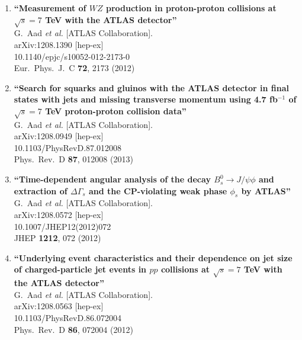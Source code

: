\documentclass{article}
\begin{document}
\begin{enumerate}
\item%
{\bf ``Measurement of $WZ$ production in proton-proton collisions at $\sqrt{s}=7$ TeV with the ATLAS detector''}
  \\{}G.~Aad {\it et al.}  [ATLAS Collaboration].
  \\{}arXiv:1208.1390 [hep-ex]
    \\{}10.1140/epjc/s10052-012-2173-0
\\{}Eur.\ Phys.\ J.\ C {\bf 72}, 2173 (2012) %


\item%
{\bf ``Search for squarks and gluinos with the ATLAS detector in final states with jets and missing transverse momentum using 4.7 fb$^{-1}$ of $\sqrt{s}=7$ TeV proton-proton collision data''}
  \\{}G.~Aad {\it et al.}  [ATLAS Collaboration].
  \\{}arXiv:1208.0949 [hep-ex]
    \\{}10.1103/PhysRevD.87.012008
\\{}Phys.\ Rev.\ D {\bf 87}, 012008 (2013) %


\item%
{\bf ``Time-dependent angular analysis of the decay $B_{s}^{0} \to J/{\psi\phi}$ and extraction of $\Delta\Gamma_{s}$ and the CP-violating weak phase $\phi_s$ by ATLAS''}
  \\{}G.~Aad {\it et al.}  [ATLAS Collaboration].
  \\{}arXiv:1208.0572 [hep-ex]
    \\{}10.1007/JHEP12(2012)072
\\{}JHEP {\bf 1212}, 072 (2012) %


\item%
{\bf ``Underlying event characteristics and their dependence on jet size of charged-particle jet events in $pp$ collisions at $\sqrt{s}=7$ TeV with the ATLAS detector''}
  \\{}G.~Aad {\it et al.}  [ATLAS Collaboration].
  \\{}arXiv:1208.0563 [hep-ex]
    \\{}10.1103/PhysRevD.86.072004
\\{}Phys.\ Rev.\ D {\bf 86}, 072004 (2012) %



\end{enumerate}
\end{document}
